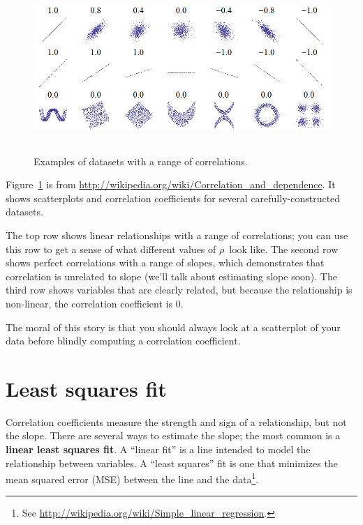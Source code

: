 \begin{figure}
\centerline{\includegraphics[height=2.5in]{statistics/Correlation_examples.png}}
\caption{Examples of datasets with a range of correlations.}
\label{corr_examples}
\end{figure}

Figure~\ref{corr_examples} is from
\url{http://wikipedia.org/wiki/Correlation_and_dependence}.  It shows
scatterplots and correlation coefficients for several
carefully-constructed datasets.

The top row shows linear relationships with a range of correlations;
you can use this row to get a sense of what different values of
$\rho$~look like.  The second row shows perfect correlations with a
range of slopes, which demonstrates that correlation is unrelated to
slope (we'll talk about estimating slope soon).  The third row shows
variables that are clearly related, but because the relationship is
non-linear, the correlation coefficient is 0.

The moral of this story is that you should always look at a scatterplot of
your data before blindly computing a correlation coefficient.

\section{Least squares fit}

Correlation coefficients measure the strength and sign of a
relationship, but not the slope.  There are several ways to estimate
the slope; the most common is a \textbf{linear least squares fit}.  A
``linear fit'' is a line intended to model the relationship between
variables.  A ``least squares'' fit is one that minimizes the mean
squared error (MSE) between the line and the data\footnote{See
  \url{http://wikipedia.org/wiki/Simple_linear_regression}.}.


